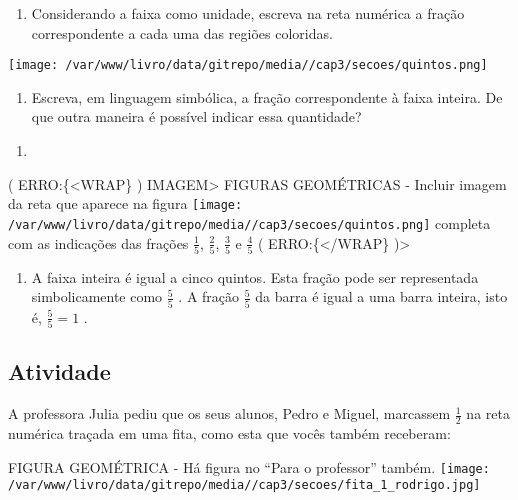 \documentclass[a4,12pt]{book}
\begin{document}
\begin{enumerate} [\quad a)] %
  \item     Considerando a faixa como unidade, escreva na reta numérica a fração correspondente a cada uma das regiões coloridas.
\end{enumerate} %

\texttt{[image: /var/www/livro/data/gitrepo/media//cap3/secoes/quintos.png]} \mbox{} \newline  

\begin{enumerate} [\quad a)] %
  \item     Escreva, em linguagem simbólica, a fração correspondente à faixa inteira. De que outra maneira é possível indicar essa quantidade? 
\end{enumerate} %

\begin{enumerate} [\quad a)] %
  \item         \mbox{} \newline      
\end{enumerate} %
( ERRO:\{<WRAP\} ) IMAGEM> FIGURAS GEOMÉTRICAS - Incluir imagem da reta que aparece na figura \texttt{[image: /var/www/livro/data/gitrepo/media//cap3/secoes/quintos.png]} completa com as indicações das frações $\frac{1}{5}$, $\frac{2}{5}$, $\frac{3}{5}$ e $\frac{4}{5}$ ( ERRO:\{</WRAP\} )>
\begin{enumerate} [\quad a)] %
  \item     A faixa inteira é igual a cinco quintos. Esta fração pode ser representada simbolicamente como     $\frac{5}{5}$    . A fração     $\frac{5}{5}$     da barra é igual a uma barra inteira, isto é,     $\frac{5}{5}=1$    . 
\end{enumerate} %


\subsection{Atividade}

A professora Julia pediu que os seus alunos, Pedro e Miguel, marcassem $\frac{1}{2}$ na reta numérica traçada em uma fita, como esta que vocês também receberam:

\begin{imagem*}[breakable]{}{}   FIGURA GEOMÉTRICA - Há figura no   ``Para o professor''   também.  
    \texttt{[image: /var/www/livro/data/gitrepo/media//cap3/secoes/fita\_1\_rodrigo.jpg]}  
\end{imagem*}
\end{document}
